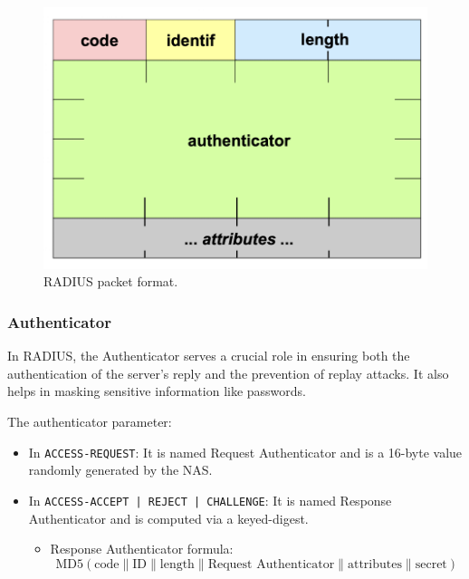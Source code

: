 \begin{figure}[H]
    \includegraphics[width=\linewidth]{Images/NetSec/radius_packet_format.png}
    \caption{RADIUS packet format.}
    
\end{figure}

\subsubsection{Authenticator}
In RADIUS, the Authenticator serves a crucial role in ensuring both the authentication of the server’s reply and the prevention of replay attacks. It also helps in masking sensitive information like passwords.

\hfill

The authenticator parameter:
\begin{itemize}
    \item In \texttt{ACCESS-REQUEST}: It is named Request Authenticator and is a 16-byte value randomly generated by the NAS.
    \item In \texttt{ACCESS-ACCEPT | REJECT | CHALLENGE}: It is named Response Authenticator and is computed via a keyed-digest.
    \begin{itemize}
        \item Response Authenticator formula:
        \begin{equation*}
            \text{MD5}(\text{code} \| \text{ID} \| \text{length} \|\text{Request Authenticator} \| \text{attributes} \| \text{secret})
        \end{equation*}
    \end{itemize}
\end{itemize}

